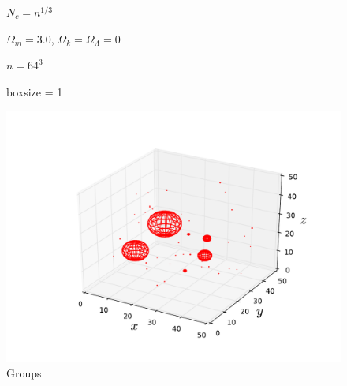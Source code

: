 \documentclass[10pt]{article}
\begin{document}
\begin{figure}[htbp]
\centering

\end{figure}

\begin{figure}[htbp]
\centering

\caption{$N_c = n^{1/3}$}
\end{figure}

\begin{figure}[htbp]
\centering

\caption{$\Omega_m = 3.0$, $\Omega_k = \Omega_\Lambda = 0$}
\end{figure}

\begin{figure}[htbp]
\centering

\caption{$n = 64^3$}
\end{figure}

\begin{figure}[htbp]
\centering

\caption{boxsize = 1}
\end{figure}

\begin{figure}[htbp]
\centering

\includegraphics{Control_Groups.pdf}
\caption{Groups}
\label{fig:groups}
\end{figure}
\end{document}
